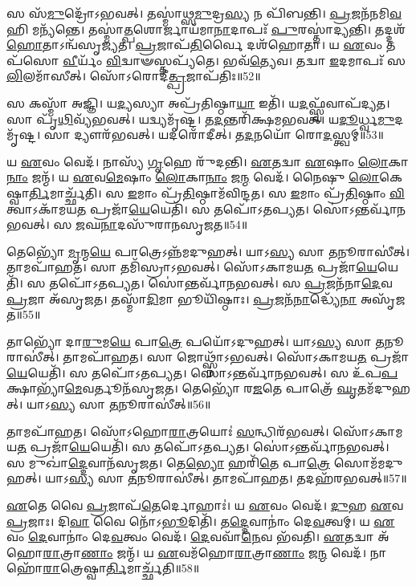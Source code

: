 𑌸 𑌸᳴\-\ul{𑌮𑍁}\-𑌦𑍍𑌰𑍋᳴\-𑌽𑌭𑌵𑌤𑍍।
𑌤𑌸𑍍𑌮𑌾॑𑌥𑍍𑌸\-\ul{𑌮𑍁}\-𑌦𑍍𑌰\-\ul{𑌸𑍍𑌯} 𑌨 𑌪𑌿᳴𑌬𑌨𑍍𑌤𑌿।
\-\ul{𑌪𑍍𑌰}\-𑌜𑌨᳴𑌨𑌮𑌿\-\ul{𑌵} 𑌹𑌿 𑌮𑌨𑍍𑌯᳴𑌨𑍍𑌤𑍇।
𑌤𑌸𑍍𑌮𑌾॑\-\ul{𑌤𑍍𑌪}\-𑌶𑍋𑌰𑍍𑌜𑌾𑌯᳴𑌮𑌾\-\ul{𑌨𑌾}\-𑌦𑌾𑌪𑌃᳴ \ul{𑌪𑍁}\-𑌰𑌸𑍍𑌤𑌾॑𑌦𑍍𑌯𑌨𑍍𑌤𑌿।
𑌤𑌦𑍍𑌦𑌶᳴\-\ul{𑌹𑍋}\-𑌤𑌾\-𑌽𑌨𑍍𑌵᳴𑌸𑍃𑌜𑍍𑌯𑌤।
\-\ul{𑌪𑍍𑌰}\-𑌜𑌾𑌪᳴\-\ul{𑌤𑌿}\-𑌰𑍍𑌵𑍈 𑌦𑌶᳴𑌹𑍋𑌤𑌾।
𑌯 \ul{𑌏}\-𑌵𑌂 𑌤𑌪᳴𑌸𑍋 \ul{𑌵𑍀}\-𑌰𑍍𑌯𑌂᳴ \ul{𑌵𑌿}\-𑌦𑍍𑌵𑌾𑍟𑌸𑍍𑌤𑌪𑍍𑌯᳴𑌤𑍇।
𑌭𑌵᳴\-\ul{𑌤𑍍𑌯𑍇}\-𑌵।
𑌤𑌦𑍍𑌵𑌾 \ul{𑌇}\-𑌦𑌮𑌾𑌪𑌃᳴ 𑌸\-\ul{𑌲𑌿}\-𑌲𑌮𑌾᳴𑌸𑍀𑌤𑍍।
𑌸𑍋᳴𑌽𑌰𑍋𑌦𑍀\-\ul{𑌤𑍍𑌪𑍍𑌰}\-𑌜𑌾\-𑌪᳴𑌤𑌿𑌃॥52॥

𑌸 𑌕𑌸𑍍𑌮𑌾᳴ 𑌅𑌜𑍍𑌞𑌿।
𑌯\-\ul{𑌦𑍍𑌯}\-𑌸𑍍𑌯𑌾 𑌅𑌪𑍍𑌰᳴𑌤𑌿𑌷𑍍𑌠𑌾\-\ul{𑌯𑌾} 𑌇𑌤𑌿᳴।
𑌯\-\ul{𑌦}\-𑌫𑍍𑌸𑍍𑌵᳴𑌵𑌾𑌪᳴𑌦𑍍𑌯𑌤।
𑌸𑌾 𑌪𑍃᳴\-\ul{𑌥𑌿}\-𑌵𑍍𑌯᳴𑌭𑌵𑌤𑍍।
𑌯𑌦𑍍𑌵𑍍𑌯𑌮𑍃᳴𑌷𑍍𑌟।
𑌤\-\ul{𑌦}\-𑌨𑍍𑌤𑌰𑌿᳴𑌕𑍍𑌷𑌮\-𑌭𑌵𑌤𑍍।
𑌯\-\ul{𑌦𑍂}\-𑌰𑍍𑌧𑍍𑌵\-\ul{𑌮𑍁}\-𑌦𑌮𑍃᳴𑌷𑍍𑌟।
𑌸𑌾 𑌦𑍍𑌯𑍗𑌰᳴𑌭𑌵𑌤𑍍।
𑌯𑌦𑌰𑍋᳴𑌦𑍀𑌤𑍍।
𑌤\-\ul{𑌦}\-𑌨𑌯𑍋᳴ 𑌰𑍋\-\ul{𑌦}\-𑌸𑍍𑌤𑍍𑌵𑌮𑍍॥53॥

𑌯 \ul{𑌏}\-𑌵𑌂 𑌵𑍇𑌦᳴।
𑌨𑌾𑌸𑍍𑌯᳴ \ul{𑌗𑍃}\-𑌹𑍇 𑌰𑍁᳴𑌦𑌨𑍍𑌤𑌿।
\-\ul{𑌏}\-𑌤𑌦𑍍𑌵𑌾 \ul{𑌏}\-𑌷𑌾𑌂 \ul{𑌲𑍋}\-𑌕𑌾\-\ul{𑌨𑌾𑌂} 𑌜𑌨𑍍𑌮᳴।
𑌯 \ul{𑌏}\-𑌵\-\ul{𑌮𑍇}\-𑌷𑌾𑌂 \ul{𑌲𑍋}\-𑌕𑌾\-\ul{𑌨𑌾𑌂} 𑌜\-\ul{𑌨𑍍𑌮} 𑌵𑍇𑌦᳴।
𑌨𑍈𑌷𑍁 \ul{𑌲𑍋}\-𑌕𑍇𑌷𑍍𑌵𑌾\-\ul{𑌰𑍍𑌤𑌿}\-𑌮𑌾𑌰𑍍𑌚𑍍𑌛᳴𑌤𑌿।
𑌸 \ul{𑌇}\-𑌮𑌾𑌂 𑌪𑍍𑌰᳴\-\ul{𑌤𑌿}\-𑌷𑍍𑌠𑌾𑌮᳴𑌵𑌿𑌨𑍍𑌦𑌤।
𑌸 \ul{𑌇}\-𑌮𑌾𑌂 𑌪𑍍𑌰᳴\-\ul{𑌤𑌿}\-𑌷𑍍𑌠𑌾𑌂 \ul{𑌵𑌿}\-𑌤𑍍𑌵𑌾\-𑌽𑌕𑌾᳴𑌮𑌯\-\ul{𑌤} 𑌪𑍍𑌰𑌜𑌾᳴\-\ul{𑌯𑍇}\-𑌯𑍇𑌤𑌿᳴।
𑌸 𑌤𑌪𑍋᳴\-𑌽𑌤𑌪𑍍𑌯𑌤।
𑌸𑍋॑𑌽𑌨𑍍𑌤𑌰𑍍𑌵𑌾᳴𑌨𑌭𑌵𑌤𑍍।
𑌸 \ul{𑌜}\-𑌘\-\ul{𑌨𑌾}\-𑌦𑌸𑍁᳴𑌰𑌾𑌨\-𑌸𑍃𑌜𑌤॥54॥

𑌤𑍇𑌭𑍍𑌯𑍋᳴ \ul{𑌮𑍃}\-𑌨𑍍𑌮\-\ul{𑌯𑍇} 𑌪𑌾𑌤𑍍𑌰𑍇\-𑌽𑌨𑍍𑌨᳴𑌮𑌦𑍁𑌹𑌤𑍍।
𑌯𑌾𑌽\-\ul{𑌸𑍍𑌯} 𑌸𑌾 \ul{𑌤}\-𑌨𑍂𑌰𑌾𑌸𑍀॑𑌤𑍍।
𑌤𑌾𑌮𑌪𑌾᳴𑌹𑌤।
𑌸𑌾 𑌤𑌮𑌿᳴𑌸𑍍𑌰𑌾\-𑌽𑌭𑌵𑌤𑍍।
𑌸𑍋᳴𑌽𑌕𑌾𑌮𑌯\-\ul{𑌤} 𑌪𑍍𑌰𑌜𑌾᳴\-\ul{𑌯𑍇}\-𑌯𑍇𑌤𑌿᳴।
𑌸 𑌤𑌪𑍋᳴\-𑌽𑌤𑌪𑍍𑌯𑌤।
𑌸𑍋॑𑌨𑍍𑌤𑌰𑍍𑌵𑌾᳴𑌨𑌭𑌵𑌤𑍍।
𑌸 \ul{𑌪𑍍𑌰}\-𑌜𑌨᳴𑌨𑌾\-\ul{𑌦𑍇}\-𑌵 \ul{𑌪𑍍𑌰}\-𑌜𑌾 𑌅᳴\-𑌸𑍃𑌜𑌤।
𑌤𑌸𑍍𑌮𑌾᳴\-\ul{𑌦𑌿}\-𑌮𑌾 𑌭𑍂𑌯𑌿᳴𑌷𑍍𑌠𑌾𑌃।
\-\ul{𑌪𑍍𑌰}\-𑌜𑌨᳴\-\ul{𑌨𑌾}\-𑌦𑍍𑌧𑍍𑌯𑍇᳴\-\ul{𑌨𑌾} 𑌅𑌸𑍃᳴𑌜𑌤॥55॥

𑌤𑌾𑌭𑍍𑌯𑍋᳴ 𑌦𑌾\-\ul{𑌰𑍁}\-𑌮\-\ul{𑌯𑍇} 𑌪𑌾\-\ul{𑌤𑍍𑌰𑍇} 𑌪𑌯𑍋᳴\-𑌽𑌦𑍁𑌹𑌤𑍍।
𑌯𑌾𑌽\-\ul{𑌸𑍍𑌯} 𑌸𑌾 \ul{𑌤}\-𑌨𑍂𑌰𑌾𑌸𑍀॑𑌤𑍍।
𑌤𑌾𑌮𑌪𑌾᳴𑌹𑌤।
𑌸𑌾 𑌜𑍋𑌥𑍍𑌸𑍍𑌨𑌾᳴\-𑌽𑌭𑌵𑌤𑍍।
𑌸𑍋᳴𑌽𑌕𑌾𑌮𑌯\-\ul{𑌤} 𑌪𑍍𑌰𑌜𑌾᳴\-\ul{𑌯𑍇}\-𑌯𑍇𑌤𑌿᳴।
𑌸 𑌤𑌪𑍋᳴\-𑌽𑌤𑌪𑍍𑌯𑌤।
𑌸𑍋॑𑌽𑌨𑍍𑌤𑌰𑍍𑌵𑌾᳴𑌨𑌭𑌵𑌤𑍍।
𑌸 𑌉᳴𑌪\-\ul{𑌪}\-𑌕𑍍𑌷𑌾𑌭𑍍𑌯𑌾᳴\-\ul{𑌮𑍇}\-𑌵𑌰𑍍𑌤𑍂𑌨᳴\-𑌸𑍃𑌜𑌤।
𑌤𑍇𑌭𑍍𑌯𑍋᳴ 𑌰\-\ul{𑌜}\-𑌤𑍇 𑌪𑌾𑌤𑍍𑌰𑍇᳴ \ul{𑌘𑍃}\-𑌤𑌮᳴𑌦𑍁𑌹𑌤𑍍।
𑌯𑌾𑌽\-\ul{𑌸𑍍𑌯} 𑌸𑌾 \ul{𑌤}\-𑌨𑍂𑌰𑌾𑌸𑍀॑𑌤𑍍॥56॥

𑌤𑌾𑌮𑌪𑌾᳴𑌹𑌤।
𑌸𑍋᳴𑌽𑌹𑍋\-\ul{𑌰𑌾}\-𑌤𑍍𑌰𑌯𑍋𑌃॑ \ul{𑌸}\-𑌨𑍍𑌧𑌿𑌰᳴𑌭𑌵𑌤𑍍।
𑌸𑍋᳴𑌽𑌕𑌾𑌮𑌯\-\ul{𑌤} 𑌪𑍍𑌰𑌜𑌾᳴\-\ul{𑌯𑍇}\-𑌯𑍇𑌤𑌿᳴।
𑌸 𑌤𑌪𑍋᳴\-𑌽𑌤𑌪𑍍𑌯𑌤।
𑌸𑍋॑𑌽𑌨𑍍𑌤𑌰𑍍𑌵𑌾᳴𑌨𑌭𑌵𑌤𑍍।
𑌸 𑌮𑍁𑌖𑌾॑\-\ul{𑌦𑍍𑌦𑍇}\-𑌵𑌾𑌨᳴\-𑌸𑍃𑌜𑌤।
𑌤𑍇\-\ul{𑌭𑍍𑌯𑍋} 𑌹𑌰𑌿᳴\-\ul{𑌤𑍇} 𑌪𑌾\-\ul{𑌤𑍍𑌰𑍇} 𑌸𑍋𑌮᳴𑌮𑌦𑍁𑌹𑌤𑍍।
𑌯𑌾𑌽\-\ul{𑌸𑍍𑌯} 𑌸𑌾 \ul{𑌤}\-𑌨𑍂𑌰𑌾𑌸𑍀॑𑌤𑍍।
𑌤𑌾𑌮𑌪𑌾᳴𑌹𑌤।
𑌤𑌦𑌹᳴𑌰𑌭𑌵𑌤𑍍॥57॥

\-\ul{𑌏}\-𑌤𑍇 𑌵𑍈 \ul{𑌪𑍍𑌰}\-𑌜𑌾𑌪᳴\-\ul{𑌤𑍇}\-𑌰𑍍𑌦𑍋𑌹𑌾𑌃॑।
𑌯 \ul{𑌏}\-𑌵𑌂 𑌵𑍇𑌦᳴।
\-\ul{𑌦𑍁}\-𑌹 \ul{𑌏}\-𑌵 \ul{𑌪𑍍𑌰}\-𑌜𑌾𑌃।
𑌦𑌿\-\ul{𑌵𑌾} 𑌵𑍈 𑌨𑍋᳴\-𑌽\-\ul{𑌭𑍂}\-𑌦𑌿𑌤𑌿᳴।
𑌤\-\ul{𑌦𑍍𑌦𑍇}\-𑌵𑌾𑌨𑌾𑌂॑ 𑌦𑍇\-\ul{𑌵}\-𑌤𑍍𑌵𑌮𑍍।
𑌯 \ul{𑌏}\-𑌵𑌂 \ul{𑌦𑍇}\-𑌵𑌾𑌨𑌾𑌂॑ 𑌦𑍇\-\ul{𑌵}\-𑌤𑍍𑌵𑌂 𑌵𑍇𑌦᳴।
\-\ul{𑌦𑍇}\-𑌵𑌵𑌾᳴\-\ul{𑌨𑍇}\-𑌵 𑌭᳴𑌵𑌤𑌿।
\-\ul{𑌏}\-𑌤𑌦𑍍𑌵𑌾 𑌅᳴𑌹𑍋\-\ul{𑌰𑌾}\-𑌤𑍍𑌰𑌾\-\ul{𑌣𑌾𑌂} 𑌜𑌨𑍍𑌮᳴।
𑌯 \ul{𑌏}\-𑌵𑌮᳴𑌹𑍋\-\ul{𑌰𑌾}\-𑌤𑍍𑌰𑌾\-\ul{𑌣𑌾𑌂} 𑌜\-\ul{𑌨𑍍𑌮} 𑌵𑍇𑌦᳴।
𑌨𑌾𑌹𑍋᳴\-\ul{𑌰𑌾}\-𑌤𑍍𑌰𑍇𑌷𑍍𑌵𑌾\-\ul{𑌰𑍍𑌤𑌿}\-𑌮𑌾𑌰𑍍𑌚𑍍𑌛᳴𑌤𑌿॥58॥

